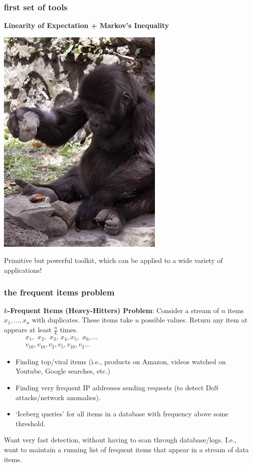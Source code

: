 \documentclass[]{beamer}
\begin{document}
	\begin{frame}
		\frametitle{first set of tools}
		\begin{center}
			\textbf{\large\alert{Linearity of Expectation + Markov's Inequality}}\vspace{.5em}
			
			\includegraphics[width=.3\textwidth]{monkey_using_tools.jpg}
			
			Primitive but powerful toolkit, which can be applied to a wide variety of applications!
		\end{center}	
	\end{frame}
	
	\begin{frame}
		\frametitle{the frequent items problem}
		\small
		\textbf{$k$-Frequent Items (Heavy-Hitters) Problem}: Consider a stream of $n$ items $x_1,\ldots, x_n$ with duplicates. These items take $u$ possible values. Return any item at appears at least $\frac{n}{k}$ times.
		\begin{align*}
			&x_1,\,\, x_2,\,\,x_3,\,x_4,x_5,\,\,x_6,\ldots\hspace{20em}\\
			&v_{10},v_{10},v_2,v_5,v_{10},v_2\ldots\hspace{20em}
		\end{align*}
		
		\begin{itemize}
			\item Finding top/viral items (i.e., products on Amazon, videos watched on Youtube, Google searches, etc.)
			\item Finding very frequent IP addresses sending requests (to detect DoS attacks/network anomalies).
			\item `Iceberg queries' for all items in a database with frequency above some threshold.
		\end{itemize}
		Want very fast detection, without having to scan through database/logs. I.e., want to maintain a running list of frequent items that appear in a stream of data items.
	\end{frame}
	
\end{document}
